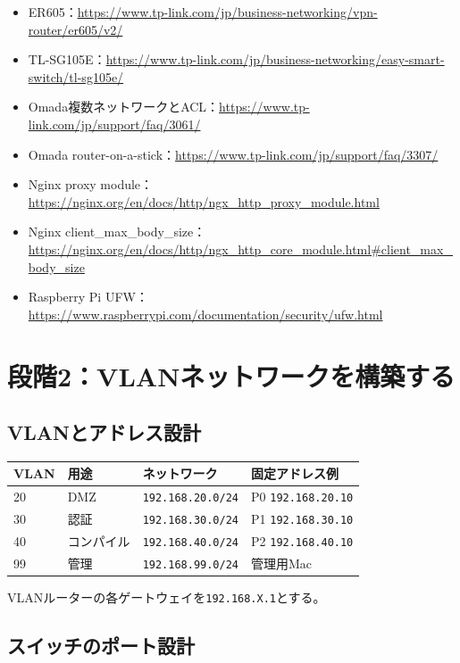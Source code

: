 \documentclass[uplatex,a4paper,11pt]{jsarticle}
\begin{document}
\begin{sloppypar}
\begin{itemize}
  \item ER605：\url{https://www.tp-link.com/jp/business-networking/vpn-router/er605/v2/}
  \item TL-SG105E：\url{https://www.tp-link.com/jp/business-networking/easy-smart-switch/tl-sg105e/}
  \item Omada複数ネットワークとACL：\url{https://www.tp-link.com/jp/support/faq/3061/}
  \item Omada router-on-a-stick：\url{https://www.tp-link.com/jp/support/faq/3307/}
  \item Nginx proxy module：\url{https://nginx.org/en/docs/http/ngx_http_proxy_module.html}
  \item Nginx client\_max\_body\_size：\url{https://nginx.org/en/docs/http/ngx_http_core_module.html#client_max_body_size}
  \item Raspberry Pi UFW：\url{https://www.raspberrypi.com/documentation/security/ufw.html}
\end{itemize}
\end{sloppypar}

\newpage
\section{段階2：VLANネットワークを構築する}

\subsection{VLANとアドレス設計}

\begin{longtable}{@{}p{18mm}p{30mm}p{48mm}p{48mm}@{}}
\toprule
VLAN & 用途 & ネットワーク & 固定アドレス例\\
\midrule
20 & DMZ & \texttt{192.168.20.0/24} & P0 \texttt{192.168.20.10}\\
30 & 認証 & \texttt{192.168.30.0/24} & P1 \texttt{192.168.30.10}\\
40 & コンパイル & \texttt{192.168.40.0/24} & P2 \texttt{192.168.40.10}\\
99 & 管理 & \texttt{192.168.99.0/24} & 管理用Mac\\
\bottomrule
\end{longtable}

VLANルーターの各ゲートウェイを\texttt{192.168.X.1}とする。

\subsection{スイッチのポート設計}
\end{document}
